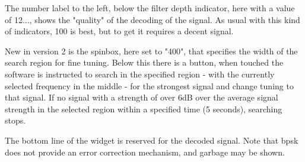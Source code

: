 \documentclass[11pt]{article}
\begin{document}
The number label to the left, below the filter depth indicator,
here with a value of 12...,
shows the "quality" of the decoding of the signal. As usual
with this kind of indicators, 100 is best, but to get it requires
a decent signal.

New in version 2 is the spinbox, here set to "400", that specifies the
width of the search region for fine tuning. Below this there is a button,
when touched the software is instructed to search in the specified region -
with the currently selected frequency in the middle - for the strongest signal
and change tuning to that signal. If no signal with a strength of over 6dB
over the average signal strength in the selected region within a specified
time (5 seconds), searching stops.
\par
The bottom line of the widget is reserved for the decoded signal. Note that
bpsk does not provide an error correction mechanism, and garbage may be shown.
\end{document}
